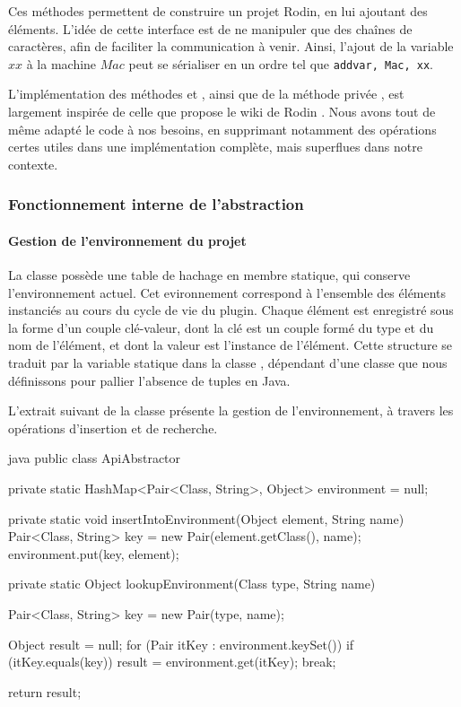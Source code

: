 Ces méthodes permettent de construire un projet Rodin, en lui ajoutant des éléments.
L'idée de cette interface est de ne manipuler que des chaînes de caractères, afin de faciliter la communication à venir.
Ainsi, l'ajout de la variable \(xx\) à la machine \(Mac\) peut se sérialiser en un ordre tel que \texttt{addvar, Mac, xx}.

L'implémentation des méthodes  et , ainsi que de la méthode privée , est largement inspirée de celle que %
propose le wiki de Rodin \cite{rodinwikicreateprojects}.
Nous avons tout de même adapté le code à nos besoins, en supprimant notamment des opérations certes utiles dans une implémentation complète, mais superflues dans notre contexte.


\subsubsection{Fonctionnement interne de l'abstraction}

\paragraph{Gestion de l'environnement du projet}

La classe  possède une table de hachage en membre statique, qui conserve l'environnement actuel.
Cet evironnement correspond à l'ensemble des éléments instanciés au cours du cycle de vie du plugin.
Chaque élément est enregistré sous la forme d'un couple clé-valeur, dont la clé est un couple formé du type et du nom de l'élément, et dont la valeur est l'instance de l'élément.
Cette structure se traduit par la variable statique  dans la classe , dépendant d'une classe  que nous définissons pour pallier %
l'absence de tuples en Java.

L'extrait suivant de la classe  présente la gestion de l'environnement, à travers les opérations d'insertion et de recherche.

\begin{imtaCode}{java}
public class ApiAbstractor {
    private static HashMap<Pair<Class, String>, Object> environment = null;

    private static void insertIntoEnvironment(Object element, String name) {
        Pair<Class, String> key = new Pair(element.getClass(), name);
        environment.put(key, element);
    }

    private static Object lookupEnvironment(Class type, String name) {
        Pair<Class, String> key = new Pair(type, name);

        Object result = null;
        for (Pair itKey : environment.keySet()) {
            if (itKey.equals(key)) {
                result = environment.get(itKey);
                break;
            }
        }

        return result;
    }
}
\end{imtaCode}

